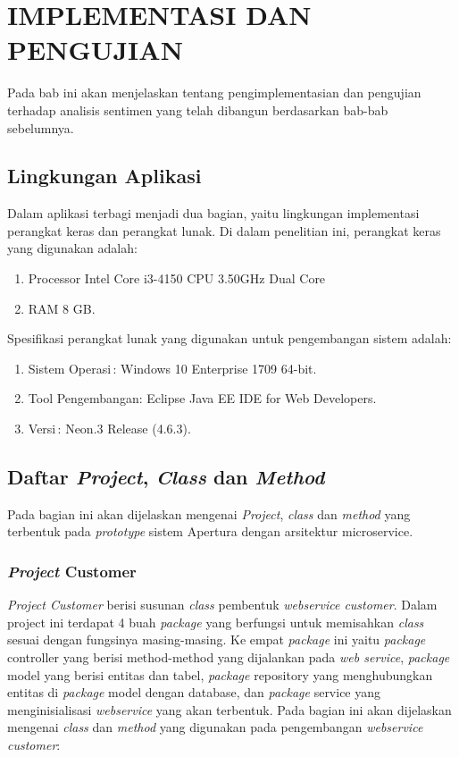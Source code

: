 \chapter{IMPLEMENTASI DAN PENGUJIAN}

%
\vspace{4.5pt}
Pada bab ini akan menjelaskan tentang pengimplementasian dan pengujian terhadap analisis sentimen yang telah dibangun berdasarkan bab-bab sebelumnya.
\section{Lingkungan Aplikasi}
Dalam aplikasi terbagi menjadi dua bagian, yaitu lingkungan implementasi perangkat keras dan perangkat lunak. Di dalam penelitian ini, perangkat keras yang digunakan adalah:
\begin{enumerate}[leftmargin=*]
	\item Processor Intel Core i3-4150 CPU 3.50GHz Dual Core
	\item RAM 8 GB.
\end{enumerate}

Spesifikasi perangkat lunak yang digunakan untuk pengembangan sistem adalah:
\begin{enumerate}[leftmargin=*]
	\item Sistem Operasi\quad\quad\quad\,: Windows 10 Enterprise 1709 64-bit.
	\item Tool Pengembangan\quad: Eclipse Java EE IDE for Web Developers.
	\item Versi\quad\quad\quad\quad\quad\quad\quad\,: Neon.3 Release (4.6.3).
\end{enumerate}

\section{Daftar \textit{Project}, \textit{Class} dan \textit{Method}}
Pada bagian ini akan dijelaskan mengenai \textit{Project}, \textit{class} dan \textit{method} yang terbentuk pada \textit{prototype} sistem Apertura dengan arsitektur microservice.
\subsection{\textit{Project} Customer}
\textit{Project Customer} berisi susunan \textit{class} pembentuk \textit{webservice customer}. Dalam project ini terdapat 4 buah \textit{package} yang berfungsi untuk memisahkan \textit{class} sesuai dengan fungsinya masing-masing. Ke empat \textit{package} ini yaitu \textit{package} controller yang berisi method-method yang dijalankan pada \textit{web service}, \textit{package} model yang berisi entitas dan tabel, \textit{package} repository yang menghubungkan entitas di \textit{package} model dengan database, dan \textit{package} service yang menginisialisasi \textit{webservice} yang akan terbentuk. Pada bagian ini akan dijelaskan mengenai \textit{class} dan \textit{method} yang digunakan pada pengembangan \textit{ webservice customer}:
